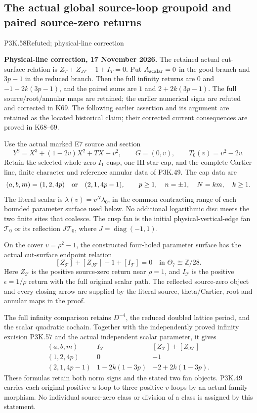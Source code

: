 \subsection{The actual global source-loop groupoid and paired source-zero returns}
\begin{statement}{P3K.58}{Refuted; physical-line correction}\par\noindent\textbf{Physical-line correction, 17 November 2026.} The retained actual cut-surface relation is \(Z_T+Z_{JT}-1+I_T=0\). Put \(A_{\rm scalar}=0\) in the good branch and \(3p-1\) in the reduced branch. Then the full infinity returns are \(0\) and \(-1-2k(3p-1)\), and the paired sums are \(1\) and \(2+2k(3p-1)\). The full source/root/annular maps are retained; the earlier numerical signs are refuted and corrected in K69. The following earlier assertion and its argument are retained as the located historical claim; their corrected current consequences are proved in K68--69.\medskip\par 

Use the actual marked E7 source and section
\[
 Y^2=X^3+(1-2v)X^2+TX+v^2,\qquad
 G=(0,v),\qquad T_0(v)=v^2-2v.
\]
Retain the selected whole-zero \(I_1\) cusp, one III-star cap,
and the complete Cartier line, finite character and reference
annular data of P3K.49. The cap data are
\[
 (a,b,m)=(1,2,4p)\quad\hbox{or}\quad(2,1,4p-1),
 \qquad p\ge1,\quad n=\pm1,\quad
 N=km,\quad k\ge1.
\]
The literal scalar is \(\lambda(v)=v^N\lambda_0\), in the
common contracting range of each bounded parameter surface
used below. No additional logarithmic disc meets the two
finite sites that coalesce. The cusp fan is the initial
physical-vertical-edge fan \(\mathcal T_0\) or its reflection
\(J\mathcal T_0\), where \(J=\operatorname{diag}(-1,1)\).

On the cover \(v=\rho^2-1\), the constructed four-holed
parameter surface has the actual cut-surface endpoint relation
\[
 [Z_{\mathcal T}]+[Z_{J\mathcal T}]+1+[I_{\mathcal T}]=0
                    \quad\text{in }\Theta_7\cong\mathbb Z/28.
\]
Here \(Z_{\mathcal T}\) is the positive source-zero return
near \(\rho=1\), and \(I_{\mathcal T}\) is the positive
\(\epsilon=1/\rho\) return with the full original scalar
path. The reflected source-zero object and every closing
arrow are supplied by the literal source, theta/Cartier,
root and annular maps in the proof.

The full infinity comparison retains \(D^{-4}\), the reduced
doubled lattice period, and the scalar quadratic cochain.
Together with the independently proved infinity excision
P3K.57 and the actual independent scalar parameter, it gives
\[
 \begin{array}{c|c|c}
 (a,b,m)&I_{\mathcal T}
                &[Z_{\mathcal T}]+[Z_{J\mathcal T}]\\ \hline
 (1,2,4p)&0&-1\\
 (2,1,4p-1)&1-2k(1-3p)&-2+2k(1-3p).
 \end{array}
\]
These formulas retain both norm signs and the stated two
fan objects. P3K.49 carries each original positive \(u\)-loop
to three positive \(v\)-loops by an actual family morphism.
No individual source-zero class or division of a class is
assigned by this statement.
\end{statement}
